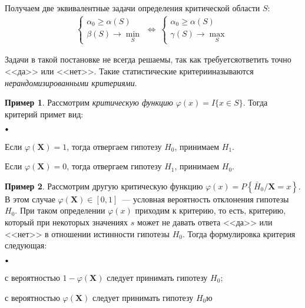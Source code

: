 \documentclass[oneside,final,14pt]{extreport}
\theoremstyle{definition}
\newtheorem*{exmp}{Пример}
\newcommand\sbullet[1][.5]{\mathbin{\vcenter{\hbox{\scalebox{#1}{$\bullet$}}}}}
\newenvironment{compactlist}{
\begin{list}{{$\sbullet[.75]$}}{
\setlength\partopsep{0pt}
\setlength\parskip{0pt}
\setlength\parsep{0pt}
\setlength\topsep{0pt}
\setlength\itemsep{0pt}
}
}{
\end{list}
}
\begin{document}
Получаем две эквивалентные задачи определения критической области $S$:
\begin{equation*}
    \begin{array}{l}
    \left\{\begin{array}{l}
    \alpha_{0} \geqslant \alpha(S) \\
    \beta(S) \rightarrow \min\limits_{S}
    \end{array}\right.
    \Leftrightarrow~
    \left\{\begin{array}{l}
    \alpha_{0} \geqslant \alpha(S) \\
    \gamma(S) \rightarrow \max\limits_{S}
    \end{array}\right.
    \end{array}
\end{equation*}

Задачи в такой постановке не всегда решаемы, так как требуетсяответить точно <<да>> или <<нет>>. Такие статистические критерииназываются {\it нерандомизированными критериями}.

\begin{exmp}
Рассмотрим {\it критическую функцию} $\varphi(x)=I\{x \in S\}$. Тогда критерий примет вид:
\begin{compactlist}
    \item Если $\varphi\left(\mathbf{X}\right)=1$, тогда отвергаем гипотезу $H_0$, принимаем $H_1$.
    \item Если $\varphi\left(\mathbf{X}\right)=0$, тогда отвергаем гипотезу $H_1$, принимаем $H_0$.
\end{compactlist}
\end{exmp}

\begin{exmp}
Рассмотрим другую критическую функцию $\varphi(x)=P\left\{\bar{H}_{0} / \mathbf{X}=x\right\}$. В этом случае $\varphi\left(\mathbf{X}\right) \in[0,1]$~--- условная вероятность отклонения гипотезы $H_0$. При таком определении $\varphi(x)$ приходим к { критерию}, то есть, критерию, который при некоторых значениях $s$ может не давать ответа <<да>> или <<нет>> в отношении истинности гипотезы $H_0$. Тогда формулировка критерия следующая:
\begin{compactlist}
    \item с вероятностью $1 - \varphi\left(\mathbf{X}\right)$ следует принимать гипотезу $H_0$;
    \item с вероятностью $\varphi\left(\mathbf{X}\right)$ следует принимать гипотезу $H_0$ю
\end{compactlist}
\end{exmp}
\end{document}
